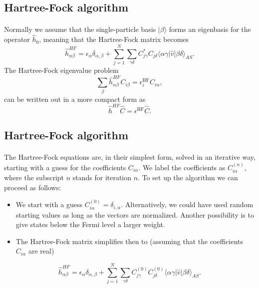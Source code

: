 \documentclass[%
twoside,                 %
final,                   %
10pt]{article}
\begin{document}
\subsection*{Hartree-Fock algorithm}

\paragraph{}
Normally we assume that the single-particle basis $|\beta\rangle$ forms an eigenbasis for the operator
$\hat{h}_0$, meaning that the Hartree-Fock matrix becomes  
\[
\hat{h}_{\alpha\beta}^{HF}=\epsilon_{\alpha}\delta_{\alpha,\beta}+
\sum_{j=1}^N\sum_{\gamma\delta} C^*_{j\gamma}C_{j\delta}\langle \alpha\gamma|\hat{v}|\beta\delta\rangle_{AS}.
\]
The Hartree-Fock eigenvalue problem
\[
\sum_{\beta}\hat{h}_{\alpha\beta}^{HF}C_{i\beta}=\epsilon_i^{\mathrm{HF}}C_{i\alpha},
\]
can be written out in a more compact form as
\[
\hat{h}^{HF}\hat{C}=\epsilon^{\mathrm{HF}}\hat{C}. 
\]



\subsection*{Hartree-Fock algorithm}

\paragraph{}
The Hartree-Fock equations are, in their simplest form, solved in an iterative way, starting with a guess for the
coefficients $C_{i\alpha}$. We label the coefficients as $C_{i\alpha}^{(n)}$, where the subscript $n$ stands for iteration $n$.
To set up the algorithm we can proceed as follows:

\begin{itemize}
 \item We start with a guess $C_{i\alpha}^{(0)}=\delta_{i,\alpha}$. Alternatively, we could have used random starting values as long as the vectors are normalized. Another possibility is to give states below the Fermi level a larger weight.

 \item The Hartree-Fock matrix simplifies then to (assuming that the coefficients $C_{i\alpha} $  are real)
\end{itemize}

\noindent
\[
\hat{h}_{\alpha\beta}^{HF}=\epsilon_{\alpha}\delta_{\alpha,\beta}+
\sum_{j = 1}^N\sum_{\gamma\delta} C_{j\gamma}^{(0)}C_{j\delta}^{(0)}\langle \alpha\gamma|\hat{v}|\beta\delta\rangle_{AS}.
\]
\end{document}
